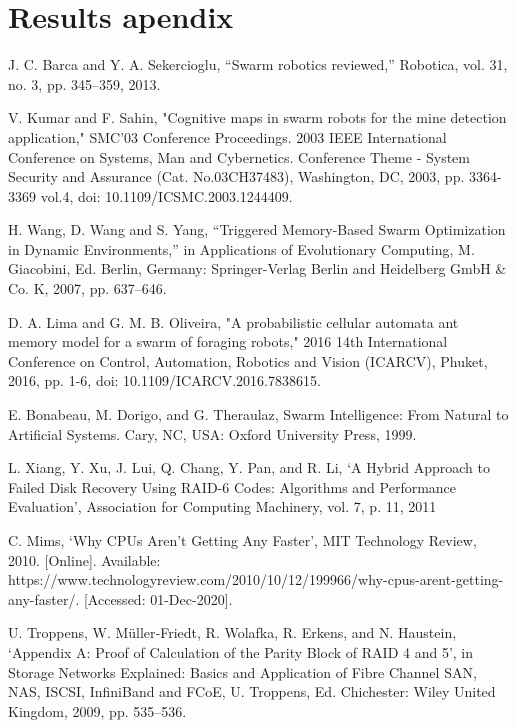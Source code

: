 \documentclass{UoYCSproject}
\begin{document}
\chapter{Results apendix}



\begin{thebibliography}{100}
J. C. Barca and Y. A. Sekercioglu, “Swarm robotics reviewed,” Robotica, vol. 31, no. 3, pp. 345–359, 2013.

V. Kumar and F. Sahin, "Cognitive maps in swarm robots for the mine detection application," SMC'03 Conference Proceedings. 2003 IEEE International Conference on Systems, Man and Cybernetics. Conference Theme - System Security and Assurance (Cat. No.03CH37483), Washington, DC, 2003, pp. 3364-3369 vol.4, doi: 10.1109/ICSMC.2003.1244409.

H. Wang, D. Wang and S. Yang, “Triggered Memory-Based Swarm Optimization in Dynamic Environments,” in Applications of Evolutionary Computing, M. Giacobini, Ed. Berlin, Germany: Springer-Verlag Berlin and Heidelberg GmbH \& Co. K, 2007, pp. 637–646.

D. A. Lima and G. M. B. Oliveira, "A probabilistic cellular automata ant memory model for a swarm of foraging robots," 2016 14th International Conference on Control, Automation, Robotics and Vision (ICARCV), Phuket, 2016, pp. 1-6, doi: 10.1109/ICARCV.2016.7838615.

E. Bonabeau, M. Dorigo, and G. Theraulaz, Swarm Intelligence: From Natural to Artificial Systems. Cary, NC, USA: Oxford University Press, 1999.

L. Xiang, Y. Xu, J. Lui, Q. Chang, Y. Pan, and R. Li, ‘A Hybrid Approach to Failed Disk Recovery Using RAID-6 Codes: Algorithms and Performance Evaluation’, Association for Computing Machinery, vol. 7, p. 11, 2011

C. Mims, ‘Why CPUs Aren’t Getting Any Faster’, MIT Technology Review, 2010. [Online]. Available: https://www.technologyreview.com/2010/10/12/199966/why-cpus-arent-getting-any-faster/. [Accessed: 01-Dec-2020].

U. Troppens, W. Müller‐Friedt, R. Wolafka, R. Erkens, and N. Haustein, ‘Appendix A: Proof of Calculation of the Parity Block of RAID 4 and 5’, in Storage Networks Explained: Basics and Application of Fibre Channel SAN, NAS, ISCSI, InfiniBand and FCoE, U. Troppens, Ed. Chichester: Wiley United Kingdom, 2009, pp. 535–536.


\end{thebibliography}
\end{document}
